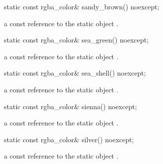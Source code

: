 \begin{itemdecl}
    static const rgba_color& sandy_brown() noexcept;
\end{itemdecl}
\begin{itemdescr}
    \pnum
    \returns
    a const reference to the static  object .
\end{itemdescr}

\begin{itemdecl}
    static const rgba_color& sea_green() noexcept;
\end{itemdecl}
\begin{itemdescr}
    \pnum
    \returns
    a const reference to the static  object .
\end{itemdescr}

\begin{itemdecl}
    static const rgba_color& sea_shell() noexcept;
\end{itemdecl}
\begin{itemdescr}
    \pnum
    \returns
    a const reference to the static  object .
\end{itemdescr}

\begin{itemdecl}
    static const rgba_color& sienna() noexcept;
\end{itemdecl}
\begin{itemdescr}
    \pnum
    \returns
    a const reference to the static  object .
\end{itemdescr}

\begin{itemdecl}
    static const rgba_color& silver() noexcept;
\end{itemdecl}
\begin{itemdescr}
    \pnum
    \returns
    a const reference to the static  object .
\end{itemdescr}

